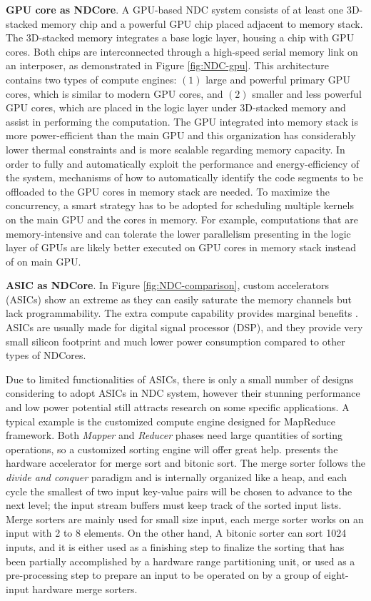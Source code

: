 \documentclass[letterpaper, 11pt, conference, margin=1in]{ieeeconf}   %
\begin{document}
\textbf{GPU core as NDCore}. A GPU-based NDC system consists of at least one 3D-stacked memory chip and a powerful GPU chip placed adjacent to memory stack. The 3D-stacked memory integrates a base logic layer, housing a chip with GPU cores. Both chips are interconnected through a high-speed serial memory link on an interposer, as demonstrated in Figure \ref{fig:NDC-gpu}. This architecture contains two types of compute engines: $\left(1\right)$ large and powerful primary GPU cores, which is similar to modern GPU cores, and $\left(2\right)$ smaller and less powerful GPU cores, which are placed in the logic layer under 3D-stacked memory and assist in performing the computation. The GPU integrated into memory stack is more power-efficient than the main GPU and this organization has considerably lower thermal constraints and is more scalable regarding memory capacity. In order to fully and automatically exploit the performance and energy-efficiency of the system, mechanisms of how to automatically identify the code segments to be offloaded to the GPU cores in memory stack are needed. To maximize the concurrency, a smart strategy has to be adopted for scheduling multiple kernels on the main GPU and the cores in memory. For example, computations that are memory-intensive and can tolerate the lower parallelism presenting in the logic layer of GPUs are likely better executed on GPU cores in memory stack instead of on main GPU.

\textbf{ASIC as NDCore}. In Figure \ref{fig:NDC-comparison}, custom accelerators (ASICs) show an extreme as they can easily saturate the memory channels but lack programmability. The extra compute capability provides marginal benefits \cite{7446059, Loh2013APT}. ASICs are usually made for digital signal processor (DSP), and they provide very small silicon footprint and much lower power consumption compared to other types of NDCores.

Due to limited functionalities of ASICs, there is only a small number of designs considering to adopt ASICs in NDC system, however their stunning performance and low power potential still attracts research on some specific applications. A typical example is the customized compute engine designed for MapReduce framework. Both \textit{Mapper} and \textit{Reducer} phases need large quantities of sorting operations, so a customized sorting engine will offer great help. \cite{Pugsley2015FixedfunctionHS} presents the hardware accelerator for merge sort and bitonic sort. The merge sorter follows the \textit{divide and conquer} paradigm and is internally organized like a heap, and each cycle the smallest of two input key-value pairs will be chosen to advance to the next level; the input stream buffers must keep track of the sorted input lists. Merge sorters are mainly used for small size input, each merge sorter works on an input with 2 to 8 elements. On the other hand, A bitonic sorter can sort 1024 inputs, and it is either used as a finishing step to finalize the sorting that has been partially accomplished by a hardware range partitioning unit, or used as a pre-processing step to prepare an input to be operated on by a group of eight-input hardware merge sorters.
\end{document}
